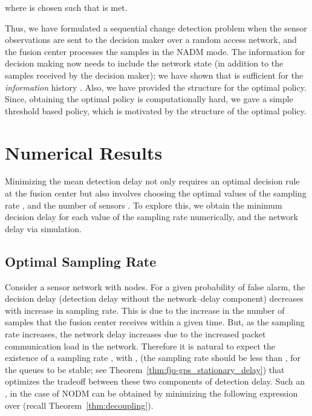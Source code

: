 \documentclass[acmtosn]{acmtrans2m}
\begin{document}
where  is chosen such that  is met.

Thus, we have formulated a sequential change detection problem when the sensor 
observations are sent to the decision maker over a random access network, and 
the fusion center processes the samples in the {\sf NADM} mode. The information 
for decision making now needs to include the network state  (in 
addition to the samples received by the decision maker); we have shown that 
 is sufficient for the {\em information} history . 
Also, we have provided the structure for the optimal policy. Since, obtaining 
the optimal policy is computationally hard, we gave a simple threshold based 
policy, which is motivated by the structure of the optimal policy. 



\section{Numerical Results}
\label{sec:optimal_parameters}
Minimizing the mean detection delay not only requires an optimal decision rule 
at the fusion center but also involves choosing the optimal values of the 
sampling rate , and the number of sensors . To explore this, we obtain the 
minimum decision delay for each value of the sampling rate  numerically, and 
the network delay via simulation.

\subsection{Optimal Sampling Rate}
\label{sec:optimal_sampling_rate}
Consider a sensor network with  nodes. For a given probability of false alarm, 
the decision delay (detection delay without the network--delay component) 
decreases with increase in sampling rate. This is due to the increase in the 
number of samples that the fusion center receives within a given time. But, as 
the sampling rate increases, the network delay increases due to the increased 
packet communication load in the network. Therefore it is natural to expect the 
existence of a sampling rate , with , (the sampling rate should 
be less than , for the queues to be stable; see 
Theorem~\ref{thm:fjq-gps_stationary_delay}) that optimizes the tradeoff between 
these two components of detection delay. Such an , in the case of {\sf NODM} 
can be obtained by minimizing the following expression over  (recall 
Theorem~\ref{thm:decoupling}).
\end{document}
